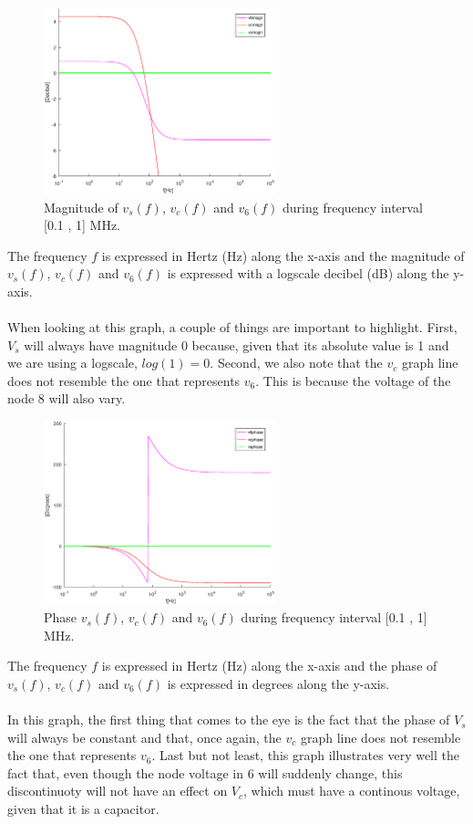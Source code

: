 \begin{figure}[H] \centering
\includegraphics[width=0.6\textwidth]{magnitude.eps}
\caption{Magnitude of $v_s(f)$,  $v_c(f)$  and $v_6(f)$ during frequency interval [0.1 , 1] MHz.}
\label{fig:magnitudetheo}
\end{figure}

The frequency $f$ is expressed in Hertz (Hz) along the x-axis and 
the magnitude of $v_s(f)$,  $v_c(f)$  and $v_6(f)$ is expressed with a logscale decibel (dB) along the y-axis.\\ \\
When looking at this graph, a couple of things are important to highlight. First, $V_s$ will always have magnitude 0 because, given that its absolute value is 1 and we are using a logscale, $log(1)=0$. Second, we also note that the $v_c$ graph line does not resemble the one that represents $v_6$. This is because the voltage of the node 8 will also vary. 


\begin{figure}[H] \centering
\includegraphics[width=0.6\textwidth]{phase.eps}
\caption{Phase $v_s(f)$,  $v_c(f)$  and $v_6(f)$ during frequency interval [0.1 , 1] MHz.}
\label{fig:phasetheo}
\end{figure}

The frequency $f$ is expressed in Hertz (Hz) along the x-axis and
the phase of $v_s(f)$,  $v_c(f)$  and $v_6(f)$ is expressed in degrees along the y-axis.\\ \\
In this graph, the first thing that comes to the eye is the fact that the phase of $V_s$ will always be constant and that, once again, the $v_c$ graph line does not resemble the one that represents $v_6$. Last but not least, this graph illustrates very well the fact that, even though the node voltage in 6 will suddenly change, this discontinuoty will not have an effect on $V_c$, which must have a continous voltage, given that it is a capacitor.

